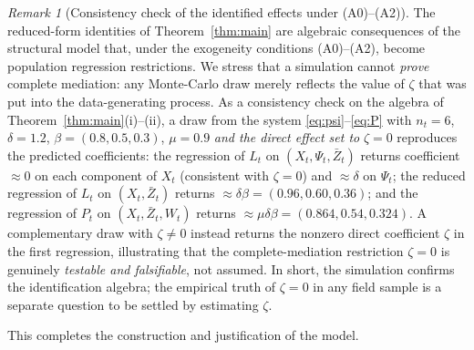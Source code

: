 \documentclass{amsart}
\theoremstyle{definition}
\theoremstyle{remark}
\newtheorem{remark}{Remark}
\begin{document}
\begin{remark}[Consistency check of the identified effects under (A0)--(A2)]
The reduced-form identities of Theorem~\ref{thm:main} are algebraic
consequences of the structural model that, under the exogeneity conditions
(A0)--(A2), become population regression restrictions. We stress that a
simulation cannot \emph{prove} complete mediation: any Monte-Carlo draw
merely reflects the value of $\zeta$ that was put into the data-generating
process. As a consistency check on the algebra of
Theorem~\ref{thm:main}(i)--(ii), a draw from the system
\eqref{eq:psi}--\eqref{eq:P} with $n_t=6$, $\delta=1.2$,
$\beta=(0.8,0.5,0.3)$, $\mu=0.9$ \emph{and the direct effect set to}
$\zeta=0$ reproduces the predicted coefficients: the regression of $L_t$
on $(X_t,\Psi_t,\bar Z_t)$ returns coefficient $\approx 0$ on each
component of $X_t$ (consistent with $\zeta=0$) and $\approx\delta$ on
$\Psi_t$; the reduced regression of $L_t$ on $(X_t,\bar Z_t)$ returns
$\approx\delta\beta=(0.96,0.60,0.36)$; and the regression of $P_t$ on
$(X_t,\bar Z_t,W_t)$ returns $\approx\mu\delta\beta=(0.864,0.54,0.324)$.
A complementary draw with $\zeta\neq0$ instead returns the nonzero direct
coefficient $\zeta$ in the first regression, illustrating that the
complete-mediation restriction $\zeta=0$ is genuinely \emph{testable and
falsifiable}, not assumed. In short, the simulation confirms the
identification algebra; the empirical truth of $\zeta=0$ in any field
sample is a separate question to be settled by estimating $\zeta$.
\end{remark}

This completes the construction and justification of the model.
\end{document}
